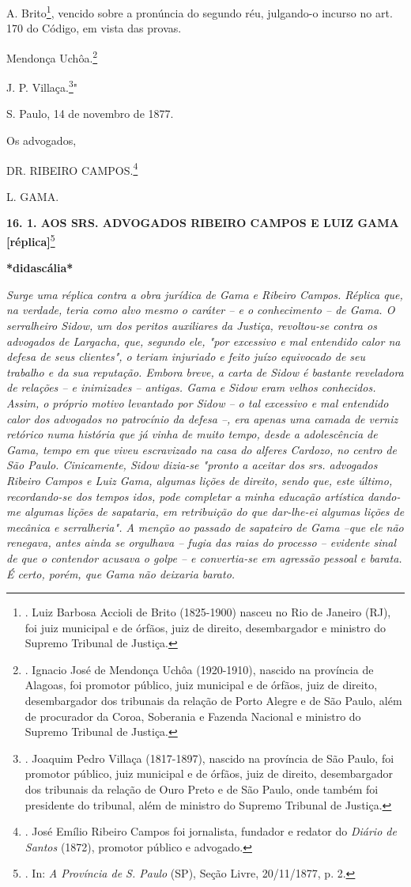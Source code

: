 A. Brito\footnote{. Luiz Barbosa Accioli de Brito (1825-1900) nasceu no
  Rio de Janeiro (RJ), foi juiz municipal e de órfãos, juiz de direito,
  desembargador e ministro do Supremo Tribunal de Justiça.}, vencido
sobre a pronúncia do segundo réu, julgando-o incurso no art. 170 do
Código, em vista das provas.

Mendonça Uchôa.\footnote{. Ignacio José de Mendonça Uchôa (1920-1910),
  nascido na província de Alagoas, foi promotor público, juiz municipal
  e de órfãos, juiz de direito, desembargador dos tribunais da relação
  de Porto Alegre e de São Paulo, além de procurador da Coroa, Soberania
  e Fazenda Nacional e ministro do Supremo Tribunal de Justiça.}

J. P. Villaça.\footnote{. Joaquim Pedro Villaça (1817-1897), nascido na
  província de São Paulo, foi promotor público, juiz municipal e de
  órfãos, juiz de direito, desembargador dos tribunais da relação de
  Ouro Preto e de São Paulo, onde também foi presidente do tribunal,
  além de ministro do Supremo Tribunal de Justiça.}"

S. Paulo, 14 de novembro de 1877.

Os advogados,

DR. RIBEIRO CAMPOS.\footnote{. José Emílio Ribeiro Campos foi
  jornalista, fundador e redator do \emph{Diário de Santos} (1872),
  promotor público e advogado.}

\protect\hypertarget{Secao_Sem_Titulo-22}{}{}L. GAMA.

\textbf{16. 1. AOS SRS. ADVOGADOS RIBEIRO CAMPOS E LUIZ GAMA
{[}réplica{]}}\footnote{. In: \emph{A Província de S. Paulo} (SP), Seção
  Livre, 20/11/1877, p. 2.}

\textbf{*didascália*}

\emph{Surge uma réplica contra a obra jurídica de Gama e Ribeiro Campos.
Réplica que, na verdade, teria como alvo mesmo o caráter -- e o
conhecimento -- de Gama. O serralheiro Sidow, um dos peritos auxiliares
da Justiça, revoltou-se contra os advogados de Largacha, que, segundo
ele, "por excessivo e mal entendido calor na defesa de seus clientes", o
teriam injuriado e feito juízo equivocado de seu trabalho e da sua
reputação. Embora breve, a carta de Sidow é bastante reveladora de
relações -- e inimizades -- antigas. Gama e Sidow eram velhos
conhecidos. Assim, o próprio motivo levantado por Sidow -- o tal
excessivo e mal entendido calor dos advogados no patrocínio da defesa
--, era apenas uma camada de verniz retórico numa história que já vinha
de muito tempo, desde a adolescência de Gama, tempo em que viveu
escravizado na casa do alferes Cardozo, no centro de São Paulo.
Cinicamente, Sidow dizia-se "pronto a aceitar dos srs. advogados Ribeiro
Campos e Luiz Gama, algumas lições de direito, sendo que, este último,
recordando-se dos tempos idos, pode completar a minha educação artística
dando-me algumas lições de sapataria, em retribuição do que dar-lhe-ei
algumas lições de mecânica e serralheria". A menção ao passado de
sapateiro de Gama --que ele não renegava, antes ainda se orgulhava --
fugia das raias do processo -- evidente sinal de que o contendor acusava
o golpe -- e convertia-se em agressão pessoal e barata. É certo, porém,
que Gama não deixaria barato. }

